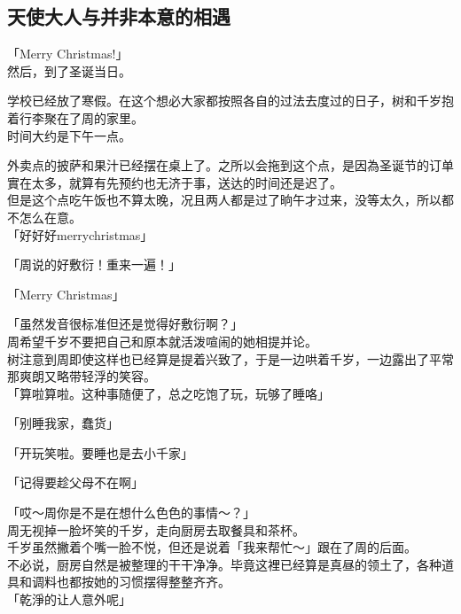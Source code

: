 \subsection{天使大人与并非本意的相遇}

「Merry Christmas!」\\

然后，到了圣诞当日。

学校已经放了寒假。在这个想必大家都按照各自的过法去度过的日子，树和千岁抱着行李聚在了周的家里。\\

时间大约是下午一点。

外卖点的披萨和果汁已经摆在桌上了。之所以会拖到这个点，是因為圣诞节的订单實在太多，就算有先预约也无济于事，送达的时间还是迟了。\\

但是这个点吃午饭也不算太晚，况且两人都是过了晌午才过来，没等太久，所以都不怎么在意。\\

「好好好merrychristmas」

「周说的好敷衍！重来一遍！」

「Merry Christmas」

「虽然发音很标准但还是觉得好敷衍啊？」\\

周希望千岁不要把自己和原本就活泼喧闹的她相提并论。\\

树注意到周即使这样也已经算是提着兴致了，于是一边哄着千岁，一边露出了平常那爽朗又略带轻浮的笑容。\\

「算啦算啦。这种事随便了，总之吃饱了玩，玩够了睡咯」

「别睡我家，蠢货」

「开玩笑啦。要睡也是去小千家」

「记得要趁父母不在啊」

「哎～周你是不是在想什么色色的事情～？」\\

周无视掉一脸坏笑的千岁，走向厨房去取餐具和茶杯。\\

千岁虽然撇着个嘴一脸不悦，但还是说着「我来帮忙～」跟在了周的后面。\\

不必说，厨房自然是被整理的干干净净。毕竟这裡已经算是真昼的领土了，各种道具和调料也都按她的习惯摆得整整齐齐。\\

「乾淨的让人意外呢」

